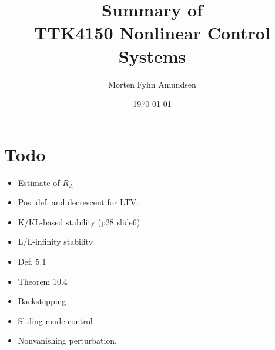 \documentclass[a4paper,12pt]{article}
\title{Summary of\\TTK4150 Nonlinear Control Systems}
\author{Morten Fyhn Amundsen}
\date{\today}
\begin{document}
\maketitle
\tableofcontents

\section{Todo}
\begin{itemize}
	\item Estimate of $R_A$
	\item Pos. def. and decrescent for LTV.
	\item K/KL-based stability (p28 slide6)
	\item L/L-infinity stability
	\item Def. 5.1
	\item Theorem 10.4
	\item Backstepping
	\item Sliding mode control
	\item Nonvanishing perturbation.
\end{itemize}










\end{document}
